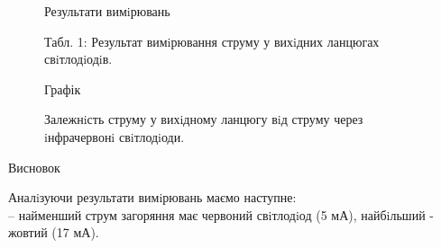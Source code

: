 \documentclass[a4paper,14pt]{extreport}
\begin{document}
\begin{figure}[h]
\begin{center}
Результати вимiрювань 
\end{center}
\caption{ Табл. 1: Результат вимiрювання струму у вихiдних ланцюгах свiтлодiодiв.}
	\label{ris2}
\end{figure}

\begin{figure}[h]
\begin{center}
Графік
\end{center}
	\caption{ Залежнiсть струму у вихiдному ланцюгу вiд струму через iнфрачервонi свiтлодiоди.}
	\label{ris1}
\end{figure}

\clearpage
\begin{center}
Висновок
\end{center}

Аналiзуючи результати вимiрювань маємо наступне:\\ 

-- найменший струм загоряння має червоний свiтлодiод (5 мА), найбiльший -
жовтий (17 мА).\\
\end{document}
